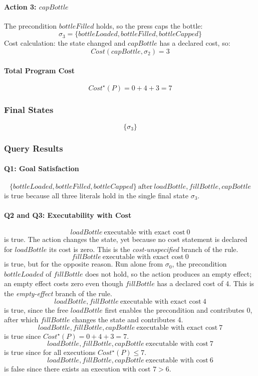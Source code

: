 \documentclass[11pt]{article}
\begin{document}
\paragraph{Action 3: $capBottle$}
The precondition $bottleFilled$ holds, so the press caps the bottle:
\[
\sigma_3 = \{bottleLoaded, bottleFilled, bottleCapped\}
\]
Cost calculation: the state changed and $capBottle$ has a declared cost, so:
\[
Cost(capBottle, \sigma_2) = 3
\]
\paragraph{Total Program Cost}
\[
Cost^\star(P) = 0 + 4 + 3 = 7
\]
\subsubsection*{Final States}
\[
\{\sigma_3\}
\]
\subsubsection*{Query Results}
\paragraph{Q1: Goal Satisfaction}
\[
\{bottleLoaded, bottleFilled, bottleCapped\} ~\text{after}~ loadBottle, fillBottle, capBottle
\]
is true because all three literals hold in the single final state $\sigma_3$.
\paragraph{Q2 and Q3: Executability with Cost}
\[
loadBottle ~\text{executable with exact cost}~ 0
\]
is true. The action changes the state, yet because no cost statement is declared for $loadBottle$ its cost is zero. This is the \emph{cost-unspecified} branch of the rule.
\[
fillBottle ~\text{executable with exact cost}~ 0
\]
is true, but for the opposite reason. Run alone from $\sigma_0$, the precondition $bottleLoaded$ of $fillBottle$ does not hold, so the action produces an empty effect; an empty effect costs zero even though $fillBottle$ has a declared cost of 4. This is the \emph{empty-effect} branch of the rule.
\[
loadBottle, fillBottle ~\text{executable with exact cost}~ 4
\]
is true, since the free $loadBottle$ first enables the precondition and contributes 0, after which $fillBottle$ changes the state and contributes 4.
\[
loadBottle, fillBottle, capBottle ~\text{executable with exact cost}~ 7
\]
is true since $Cost^\star(P) = 0 + 4 + 3 = 7$.
\[
loadBottle, fillBottle, capBottle ~\text{executable with cost}~ 7
\]
is true since for all executions $Cost^\star(P) \leq 7$.
\[
loadBottle, fillBottle, capBottle ~\text{executable with cost}~ 6
\]
is false since there exists an execution with cost $7 > 6$.
\end{document}
